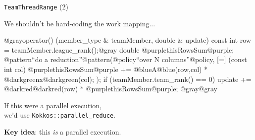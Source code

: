\begin{frame}[fragile]{\texttt{TeamThreadRange} (2)}

  We shouldn't be hard-coding the work mapping...

  \begin{code}[linebackgroundcolor={
        \btLstHL<1->{6}{bodyColor}
      },
      keywords={}
    ]
@grayoperator() (member_type & teamMember, double & update) {
  const int row = teamMember.league_rank();@gray
  double @purplethisRowsSum@purple;
  @pattern``do a reduction''@pattern(@policy``over N columns''@policy,
    [=] (const int col) {
      @purplethisRowsSum@purple += @blueA@blue(row,col) * @darkgreenx@darkgreen(col);
    });
  if (teamMember.team_rank() == 0) {
    update += @darkred@darkred(row) * @purplethisRowsSum@purple;
  }
@gray}@gray
  \end{code}

  \pause
  \vspace{5pt}

  If this were a parallel execution, \\
    \hspace{20pt}we'd use \texttt{Kokkos::parallel\_reduce}.

  \pause
  \vspace{5pt}

  \textbf{Key idea}: this \emph{is} a parallel execution.

  \pause
  \vspace{5pt}


\end{frame}


